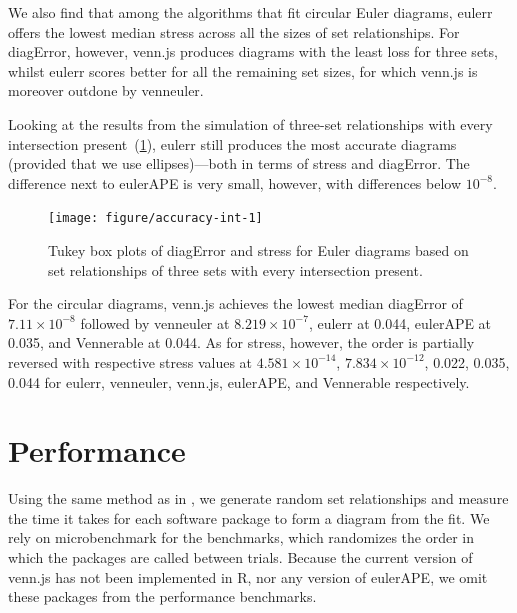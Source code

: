 \documentclass[
  oneside,
  openany,
  numbers=noendperiod,
  parskip=half,
  bibliography=totoc
]{scrbook}\usepackage[]{graphicx}\usepackage{xcolor}
\newenvironment{knitrout}{}{} %
\newcommand{\pkg}[1]{{\fontseries{b}\selectfont #1}}
\begin{document}
We also find that among the algorithms that fit circular Euler diagrams,
\pkg{eulerr} offers the lowest median stress across all the sizes of set
relationships. For diagError, however, \pkg{venn.js} produces diagrams with the
least loss for three sets, whilst \pkg{eulerr} scores better for all the remaining set sizes,
for which \pkg{venn.js} is moreover outdone by \pkg{venneuler}.



Looking at the results from the simulation of three-set relationships with
every intersection present~(\cref{fig:accuracy-int}), \pkg{eulerr} still
produces the most accurate diagrams (provided that we use ellipses)---both in
terms of stress and diagError. The
difference next to \pkg{eulerAPE} is very small, however, with differences
below $10^{-8}$.

\begin{figure}[hbtp]
\caption{Tukey box plots of diagError and stress for Euler diagrams
based on set relationships of three sets with every
intersection present.\label{fig:accuracy-int}}
\begin{knitrout}\small
{}\color{fgcolor}

{\centering \texttt{[image: figure/accuracy-int-1]} 

}



\end{knitrout}
\end{figure}

For the circular diagrams, \pkg{venn.js} achieves the lowest median diagError of
\ensuremath{7.11\times 10^{-8}} followed by \pkg{venneuler} at \ensuremath{8.219\times 10^{-7}},
\pkg{eulerr} at 0.044, \pkg{eulerAPE} at 0.035,
and \pkg{Vennerable} at 0.044. As for stress, however, the order is
partially reversed with respective stress values at
\ensuremath{4.581\times 10^{-14}}, \ensuremath{7.834\times 10^{-12}}, 0.022, 0.035,
0.044 for
\pkg{eulerr}, \pkg{venneuler}, \pkg{venn.js}, \pkg{eulerAPE}, and \pkg{Vennerable}
respectively.

\section{Performance}
\label{sec:performance}

Using the same method as in , we generate random set
relationships and measure the time it takes for each software package to form a
diagram from the fit. We rely on \pkg{microbenchmark} for the benchmarks,
which randomizes the order in which the packages are called between trials.
Because the current version of \pkg{venn.js} has not been implemented in R, nor
any version of \pkg{eulerAPE}, we omit these packages from the
performance benchmarks.
\end{document}
